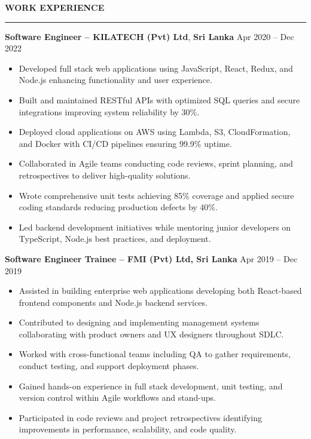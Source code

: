 \documentclass[10pt,letterpaper]{article}
\begin{document}
\vspace{8pt}

\textbf{WORK EXPERIENCE}\\[-8pt]
\noindent\rule{\textwidth}{1pt}

\vspace{-2pt}

\textbf{Software Engineer -- KILATECH (Pvt) Ltd}, \textbf{Sri Lanka} \hfill Apr 2020 -- Dec 2022

\vspace{-1pt}

\begin{itemize}
\item Developed full stack web applications using JavaScript, React, Redux, and Node.js enhancing functionality and user experience.
\item Built and maintained RESTful APIs with optimized SQL queries and secure integrations improving system reliability by 30\%.
\item Deployed cloud applications on AWS using Lambda, S3, CloudFormation, and Docker with CI/CD pipelines ensuring 99.9\% uptime.
\item Collaborated in Agile teams conducting code reviews, sprint planning, and retrospectives to deliver high-quality solutions.
\item Wrote comprehensive unit tests achieving 85\% coverage and applied secure coding standards reducing production defects by 40\%.
\item Led backend development initiatives while mentoring junior developers on TypeScript, Node.js best practices, and deployment.
\end{itemize}

\textbf{Software Engineer Trainee -- FMI (Pvt) Ltd, Sri Lanka} \hfill Apr 2019 -- Dec 2019

\vspace{-1pt}

\begin{itemize}
\item Assisted in building enterprise web applications developing both React-based frontend components and Node.js backend services.
\item Contributed to designing and implementing management systems collaborating with product owners and UX designers throughout SDLC.
\item Worked with cross-functional teams including QA to gather requirements, conduct testing, and support deployment phases.
\item Gained hands-on experience in full stack development, unit testing, and version control within Agile workflows and stand-ups.
\item Participated in code reviews and project retrospectives identifying improvements in performance, scalability, and code quality.
\end{itemize}
\end{document}
